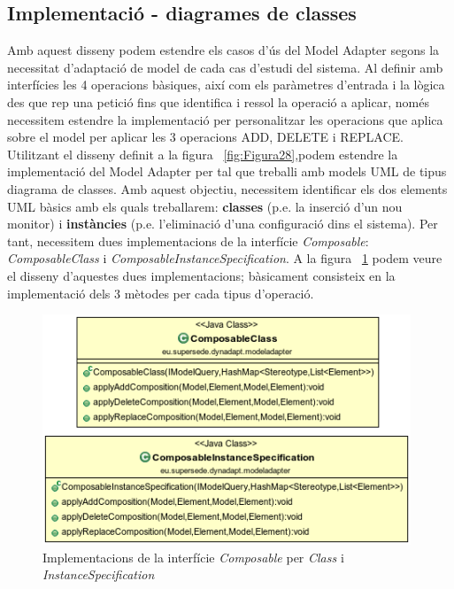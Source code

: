 \subsection{Implementació - diagrames de classes}

Amb aquest disseny podem estendre els casos d'ús del Model Adapter segons la necessitat d'adaptació de model de cada cas d'estudi del sistema. Al definir amb interfícies les 4 operacions bàsiques, així com els paràmetres d'entrada i la lògica des que rep una petició fins que identifica i ressol la operació a aplicar, només necessitem estendre la implementació per personalitzar les operacions que aplica sobre el model per aplicar les 3 operacions ADD, DELETE i REPLACE.\\

Utilitzant el disseny definit a la figura ~\ref{fig:Figura28},podem estendre la implementació del Model Adapter per tal que treballi amb models UML de tipus diagrama de classes. Amb aquest objectiu, necessitem identificar els dos elements UML bàsics amb els quals treballarem: \textbf{classes} (p.e. la inserció d'un nou monitor) i \textbf{instàncies} (p.e. l'eliminació d'una configuració dins el sistema). Per tant, necessitem dues implementacions de la interfície \textit{Composable}: \textit{ComposableClass} i \textit{ComposableInstanceSpecification}. A la figura ~\ref{fig:Figura31} podem veure el disseny d'aquestes dues implementacions; bàsicament consisteix en la implementació dels 3 mètodes per cada tipus d'operació.\\

\begin{figure}
\centering
\includegraphics[width=11cm]{Figures/Figure31}
\decoRule
\caption{Implementacions de la interfície \textit{Composable} per \textit{Class} i \textit{InstanceSpecification}}
\label{fig:Figura31}
\end{figure}  

